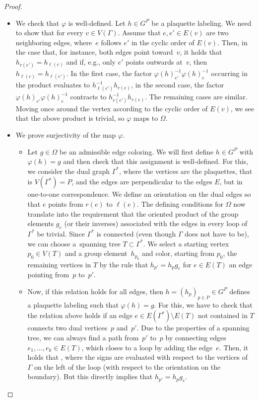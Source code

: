 \documentclass[pdftex]{sigma}
\numberwithin{equation}{section}
\theoremstyle{definition}
\begin{document}
\begin{proof}
\begin{itemize}\itemsep=0pt
 \item We check that $\varphi$ is well-defined. Let $h \in G^P$ be a plaquette labeling. We need to show that  for every $v \in V(\Gamma)$. Assume that $e, e' \in E(v)$ are two neighboring edges, where~$e$ follows $e'$ in the cyclic order of $E(v)$. Then, in the case that, for instance, both edges point toward~$v$, it holds that $h_{r(e')} = h_{\ell(e)}$ and if, e.g., only $e'$ points outwards at~$v$, then $h_{\ell(e)} = h_{\ell(e')}$. In the first case, the factor $\varphi(h)_{e'}^{-1}\varphi(h)_e^{-1}$ occurring in the product evaluates to $h_{\ell(e')}^{-1}h_{r(e)}$, in the second case, the factor $\varphi(h)_{e'}\varphi(h)_e^{-1}$ contracts to $h_{r(e')}^{-1}h_{r(e)}$. The remaining cases are similar. Moving once around the vertex according to the cyclic order of $E(v)$, we see that the above product is trivial, so $\varphi$ maps to $\Omega$.
 \item We prove surjectivity of the map $\varphi$.
 \begin{itemize}\itemsep=0pt
 \item Let $g \in \Omega$ be an admissible edge coloring. We will first define $h \in G^P$ with $\varphi(h) = g$ and then check that this assignment is well-defined. For this, we consider the dual graph $\Gamma^*$, where the vertices are the plaquettes, that is $V(\Gamma^*) = P$, and the edges are perpendicular to the edges $E$, but in one-to-one correspondence. We define an orientation on the dual edges so that $e$ points from $r(e)$ to $\ell(e)$. The defining conditions for $\Omega$ now translate into the requirement that the oriented product of the group elements $g_e$ (or their inverses) associated with the edges in every loop of~$\Gamma^*$ be trivial. Since $\Gamma^*$ is connected (even though $\Gamma$ does not have to be), we can choose a~spanning tree $T \subset \Gamma^*$. We select a starting vertex $p_0 \in V(T)$ and a group element~$h_{p_0}$ and color, starting from $p_0$, the remaining vertices in $T$ by the rule that $h_{p'} = h_pg_e$ for $e \in E(T)$ an edge pointing from~$p$ to~$p'$.
 \item Now, if this relation holds for all edges, then $h = (h_p)_{p \in P} \in G^P$ defines a plaquette labeling such that $\varphi(h) = g$. For this, we have to check that the relation above holds if an edge $e \in E(\Gamma^*)\setminus E(T)$ not contained in $T$ connects two dual vertices~$p$ and~$p'$. Due to the properties of a spanning tree, we can always find a path from~$p'$ to~$p$ by connecting edges $e_1, \dots, e_k \in E(T)$, which closes to a loop by adding the edge~$e$. Then, it holds that , where the signs are evaluated with respect to the vertices of $\Gamma$ on the left of the loop (with respect to the orientation on the boundary). But this directly implies that $h_{p'} = h_pg_e$.
 \end{itemize}


\end{itemize}
\end{proof}
\end{document}
